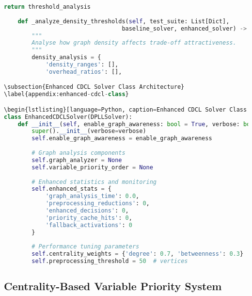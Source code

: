 \begin{lstlisting}[language=Python, caption=Threshold Analysis for Trade-off Boundaries]
        return threshold_analysis
    
    def _analyze_density_thresholds(self, test_suite: List[Dict], 
                                  baseline_solver, enhanced_solver) -> Dict:
        """
        Analyse how graph density affects trade-off attractiveness.
        """
        density_analysis = {
            'density_ranges': [],
            'overhead_ratios': [],

\subsection{Enhanced CDCL Solver Class Architecture}
\label{appendix:enhanced-cdcl-class}

\begin{lstlisting}[language=Python, caption=Enhanced CDCL Solver Class Architecture]
class EnhancedCDCLSolver(DPLLSolver):
    def __init__(self, enable_graph_awareness: bool = True, verbose: bool = False):
        super().__init__(verbose=verbose)
        self.enable_graph_awareness = enable_graph_awareness
        
        # Graph analysis components
        self.graph_analyzer = None
        self.variable_priority_order = None
        
        # Enhanced statistics and monitoring
        self.enhanced_stats = {
            'graph_analysis_time': 0.0,
            'preprocessing_reductions': 0,
            'enhanced_decisions': 0,
            'priority_cache_hits': 0,
            'fallback_activations': 0
        }
        
        # Performance tuning parameters
        self.centrality_weights = {'degree': 0.7, 'betweenness': 0.3}
        self.preprocessing_threshold = 50  # vertices
\end{lstlisting}

\subsection{Centrality-Based Variable Priority System}
\label{appendix:centrality-priority}

